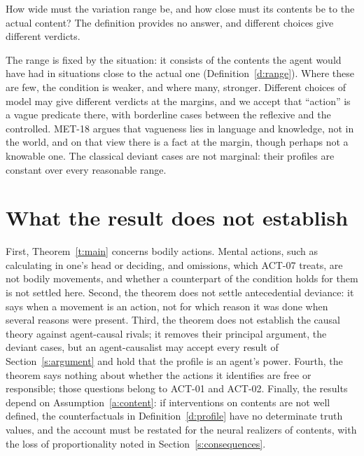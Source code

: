 \documentclass{situationist-preprint}
\begin{document}
\begin{objection}\label{o:range}
How wide must the variation range be, and how close must its contents be to the actual content? The definition provides no answer, and different choices give different verdicts.
\end{objection}

\begin{reply}
The range is fixed by the situation: it consists of the contents the agent would have had in situations close to the actual one (Definition~\ref{d:range}). Where these are few, the condition is weaker, and where many, stronger. Different choices of model may give different verdicts at the margins, and we accept that \enquote{action} is a vague predicate there, with borderline cases between the reflexive and the controlled. MET-18 argues that vagueness lies in language and knowledge, not in the world, and on that view there is a fact at the margin, though perhaps not a knowable one. The classical deviant cases are not marginal: their profiles are constant over every reasonable range.
\end{reply}

\section{What the result does not establish}\label{s:limits}

First, Theorem~\ref{t:main} concerns bodily actions. Mental actions, such as calculating in one's head or deciding, and omissions, which ACT-07 treats, are not bodily movements, and whether a counterpart of the condition holds for them is not settled here. Second, the theorem does not settle antecedential deviance: it says when a movement is an action, not for which reason it was done when several reasons were present. Third, the theorem does not establish the causal theory against agent-causal rivals; it removes their principal argument, the deviant cases, but an agent-causalist may accept every result of Section~\ref{s:argument} and hold that the profile is an agent's power. Fourth, the theorem says nothing about whether the actions it identifies are free or responsible; those questions belong to ACT-01 and ACT-02. Finally, the results depend on Assumption~\ref{a:content}: if interventions on contents are not well defined, the counterfactuals in Definition~\ref{d:profile} have no determinate truth values, and the account must be restated for the neural realizers of contents, with the loss of proportionality noted in Section~\ref{s:consequences}.
\end{document}
